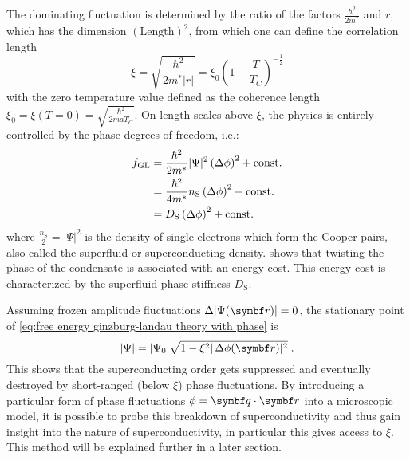\documentclass[../notes.tex]{subfiles}
\begin{document}
The dominating fluctuation is determined by the ratio of the factors \(\frac{\hbar^2}{2m^*}\) and \(r\), which has the dimension \((\mathrm{Length})^2\), from which one can define the correlation length
\begin{equation}
	\xi = \sqrt{\frac{\hbar^2}{2m^* \vert r \vert}} = \xi_0 \left(1 - \frac{T}{T_C}\right)^{-\frac{1}{2}}
	\label{eq:correlation length GL theory}
\end{equation}
with the zero temperature value defined as the coherence length \(\xi_0 = \xi(T=0) = \sqrt{\frac{\hbar^2}{2 m a T_C}}\).
On length scales above \(\xi\), the physics is entirely controlled by the phase degrees of freedom, i.e.:
\begin{align}
	f_{\mathrm{GL}} &= \frac{\hbar^2}{2 m^*} \vert \Psi \vert^2 \left(\adif{\phi}\right)^2 + \mathrm{const.} \\
	&= \frac{\hbar^2}{4 m^*} n_{\mathrm{S}} \left(\adif{\phi}\right)^2 + \mathrm{const.} \\
	&= D_{\mathrm{S}} \left(\adif{\phi}\right)^2 + \mathrm{const.} \label{eq:GL energy above correlation length}
\end{align}
where \(\frac{n_{\mathrm{S}}}{2} = \vert \Psi \vert^2\) is the density of single electrons which form the Cooper pairs, also called the superfluid or superconducting density.
 shows that twisting the phase of the condensate is associated with an energy cost.
This energy cost is characterized by the superfluid phase stiffness \(D_{\mathrm{S}}\).


Assuming frozen amplitude fluctuations \(\adif{\vert \Psi (\vb{r}) \vert} = 0\), the stationary point of \cref{eq:free energy ginzburg-landau theory with phase} is
\begin{equation}
	\vert \Psi \vert = \vert \Psi_0 \vert \sqrt{1 - \xi^2 \vert \adif{\phi} (\vb{r}) \vert^2} \;.
	\label{eq:breakdown of OP with phase fluctuations}
\end{equation}
This shows that the superconducting order gets suppressed and eventually destroyed by short-ranged (below \(\xi\)) phase fluctuations.
By introducing a particular form of phase fluctuations \(\phi = \vb{q} \cdot \vb{r}\) into a microscopic model, it is possible to probe this breakdown of superconductivity and thus gain insight into the nature of superconductivity, in particular this gives access to \(\xi\).
This method will be explained further in a later section.
\end{document}
